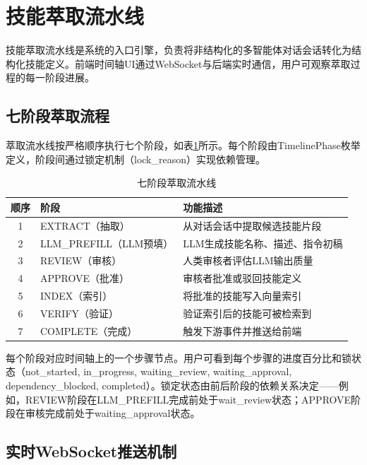 \documentclass[conference]{IEEEtran}
\begin{document}
\section{技能萃取流水线}

技能萃取流水线是系统的入口引擎，负责将非结构化的多智能体对话会话转化为结构化技能定义。前端时间轴UI通过WebSocket与后端实时通信，用户可观察萃取过程的每一阶段进展。

\subsection{七阶段萃取流程}

萃取流水线按严格顺序执行七个阶段，如表\ref{tab:phases}所示。每个阶段由TimelinePhase枚举定义，阶段间通过锁定机制（lock\_reason）实现依赖管理。

\begin{table}[h]
\centering
\caption{七阶段萃取流水线}
\label{tab:phases}
\setlength{\tabcolsep}{4pt}
\begin{tabular}{cll}
\toprule
顺序 & 阶段 & 功能描述 \\
\midrule
1 & EXTRACT（抽取） & 从对话会话中提取候选技能片段 \\
2 & LLM\_PREFILL（LLM预填） & LLM生成技能名称、描述、指令初稿 \\
3 & REVIEW（审核） & 人类审核者评估LLM输出质量 \\
4 & APPROVE（批准） & 审核者批准或驳回技能定义 \\
5 & INDEX（索引） & 将批准的技能写入向量索引 \\
6 & VERIFY（验证） & 验证索引后的技能可被检索到 \\
7 & COMPLETE（完成） & 触发下游事件并推送给前端 \\
\bottomrule
\end{tabular}
\end{table}

每个阶段对应时间轴上的一个步骤节点。用户可看到每个步骤的进度百分比和锁状态（not\_started, in\_progress, waiting\_review, waiting\_approval, dependency\_blocked, completed）。锁定状态由前后阶段的依赖关系决定——例如，REVIEW阶段在LLM\_PREFILL完成前处于wait\_review状态；APPROVE阶段在审核完成前处于waiting\_approval状态。

\subsection{实时WebSocket推送机制}
\end{document}
